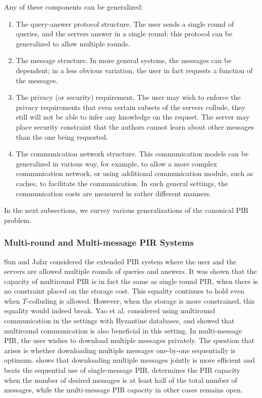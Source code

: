 Any of these components can be generalized: 
\begin{enumerate}
\item The query-answer protocol structure. The user sends a single round of queries, and the servers answer in a single round; this protocol can be generalized to allow multiple rounds. 
\item The message structure.  In more general systems, the messages can be dependent; in a less obvious variation, the user in fact requests a function of the messages.
\item The privacy (or security) requirement.  The user may wish to enforce the privacy requirements that even certain subsets of the servers collude, they still will not be able to infer any knowledge on the request. The server may place security constraint that the authors cannot learn about other messages than the one being requested. 
\item The communication network structure.  This communication models can be generalized in various way, for example, to allow a more complex communication network, or using additional communication module, such as caches, to facilitate the communication. In such general settings, the communication costs are measured in rather different manners.
\end{enumerate}

In the next subsections, we  survey various generalizations  of the canonical PIR problem. 

\subsubsection{Multi-round and Multi-message PIR Systems}
Sun and Jafar  \cite{Sun_Jafar_MPIR} considered the extended PIR system where the user and the servers are allowed multiple rounds of queries and answers. It was shown that the capacity of multiround PIR is in fact the same as single round PIR, when there is no constraint placed on the storage cost. This equality continues to hold even when $T$-colluding is allowed. However, when the storage is more constrained, this equality would indeed break. Yao et al. \cite{yao2019capacity} considered using multiround communication in the settings with Byzantine databases, and showed that multiround communication is also beneficial in this setting. In multi-message PIR, the user wishes to download multiple messages privately. The question that arises is whether downloading multiple messages one-by-one sequentially is optimum. \cite{MMPIR} shows that downloading multiple messages jointly is more efficient and beats the sequential use of single-message PIR. \cite{MMPIR} determines the PIR capacity when the number of desired messages is at least half of the total number of messages, while the multi-message PIR capacity in other cases remains open. 

